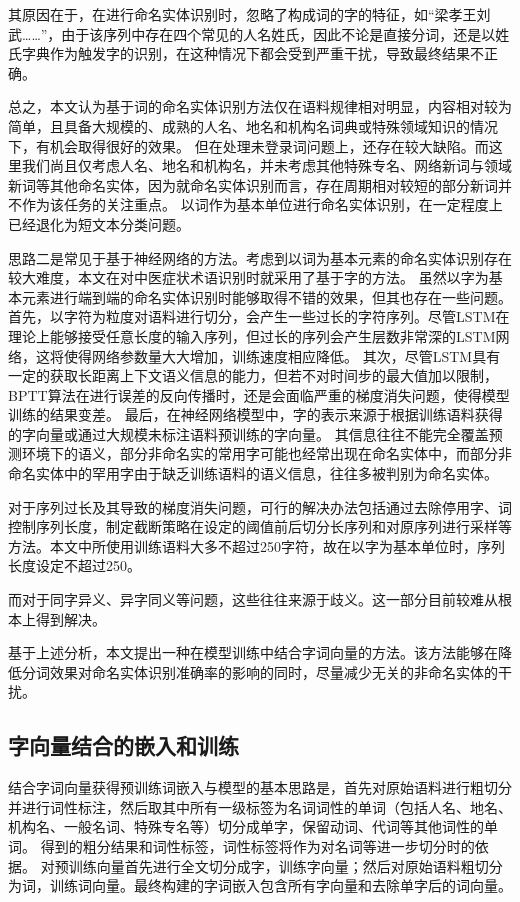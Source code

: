 其原因在于，在进行命名实体识别时，忽略了构成词的字的特征，如“梁孝王刘武……”，由于该序列中存在四个常见的人名姓氏，因此不论是直接分词，还是以姓氏字典作为触发字的识别，在这种情况下都会受到严重干扰，导致最终结果不正确。

总之，本文认为基于词的命名实体识别方法仅在语料规律相对明显，内容相对较为简单，且具备大规模的、成熟的人名、地名和机构名词典或特殊领域知识的情况下，有机会取得很好的效果。
但在处理未登录词问题上，还存在较大缺陷。而这里我们尚且仅考虑人名、地名和机构名，并未考虑其他特殊专名、网络新词与领域新词等其他命名实体，因为就命名实体识别而言，存在周期相对较短的部分新词并不作为该任务的关注重点。
以词作为基本单位进行命名实体识别，在一定程度上已经退化为短文本分类问题。

思路二是常见于基于神经网络的方法。考虑到以词为基本元素的命名实体识别存在较大难度，本文在对中医症状术语识别时就采用了基于字的方法。
虽然以字为基本元素进行端到端的命名实体识别时能够取得不错的效果，但其也存在一些问题。
首先，以字符为粒度对语料进行切分，会产生一些过长的字符序列。尽管LSTM在理论上能够接受任意长度的输入序列，但过长的序列会产生层数非常深的LSTM网络，这将使得网络参数量大大增加，训练速度相应降低。
其次，尽管LSTM具有一定的获取长距离上下文语义信息的能力，但若不对时间步的最大值加以限制，BPTT算法在进行误差的反向传播时，还是会面临严重的梯度消失问题，使得模型训练的结果变差。
最后，在神经网络模型中，字的表示来源于根据训练语料获得的字向量或通过大规模未标注语料预训练的字向量。
其信息往往不能完全覆盖预测环境下的语义，部分非命名实的常用字可能也经常出现在命名实体中，而部分非命名实体中的罕用字由于缺乏训练语料的语义信息，往往多被判别为命名实体。

对于序列过长及其导致的梯度消失问题，可行的解决办法包括通过去除停用字、词控制序列长度，制定截断策略在设定的阈值前后切分长序列和对原序列进行采样等方法。本文中所使用训练语料大多不超过250字符，故在以字为基本单位时，序列长度设定不超过250。

而对于同字异义、异字同义等问题，这些往往来源于歧义。这一部分目前较难从根本上得到解决。

基于上述分析，本文提出一种在模型训练中结合字词向量的方法。该方法能够在降低分词效果对命名实体识别准确率的影响的同时，尽量减少无关的非命名实体的干扰。
\subsection{字向量结合的嵌入和训练}
\label{subsec:combine_word_char}
结合字词向量获得预训练词嵌入与模型的基本思路是，首先对原始语料进行粗切分并进行词性标注，然后取其中所有一级标签为名词词性的单词（包括人名、地名、机构名、一般名词、特殊专名等）切分成单字，保留动词、代词等其他词性的单词。
得到的粗分结果和词性标签，词性标签将作为对名词等进一步切分时的依据。
对预训练向量首先进行全文切分成字，训练字向量；然后对原始语料粗切分为词，训练词向量。最终构建的字词嵌入包含所有字向量和去除单字后的词向量。

